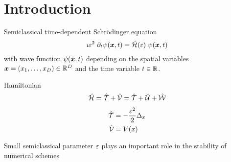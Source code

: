 





\clearemptydoublepage

\mbox{}
\vfill

\vfill
\tableofcontents

\clearpage

\listoffigures
\listofalgorithms

\clearemptydoublepage

% 
% 
% 
% 
% 
% 






\clearpage
\section{Introduction}

\cite{GH_convsemiclassical}
Semiclassical time-dependent Schrödinger equation
%
\begin{align}
	\imath \varepsilon^2 \; \partial_t \psi (\bm{x},t) = \hat{\mathcal{H}} (\varepsilon) \; \psi (\bm{x},t)
\end{align}
%
with wave function $\psi(\bm{x},t)$ depending on the spatial variables $\bm{x} = (x_1,\dots,x_D) \in \mathbb{R}^D$ and the time variable $t \in \mathbb{R}$.

Hamiltonian
\begin{align}
	\hat{\mathcal{H}} = \hat{\mathcal{T}} + \hat{\mathcal{V}} = \hat{\mathcal{T}} + \hat{\mathcal{U}} + \hat{\mathcal{W}}
\end{align}
\begin{align}
	\hat{\mathcal{T}} &= - \frac{\varepsilon^2}{2} \Delta_x \\
	\hat{\mathcal{V}} &= V(x)
\end{align}

Small semiclassical parameter $\varepsilon$ plays an important role in the stability of numerical schemes

